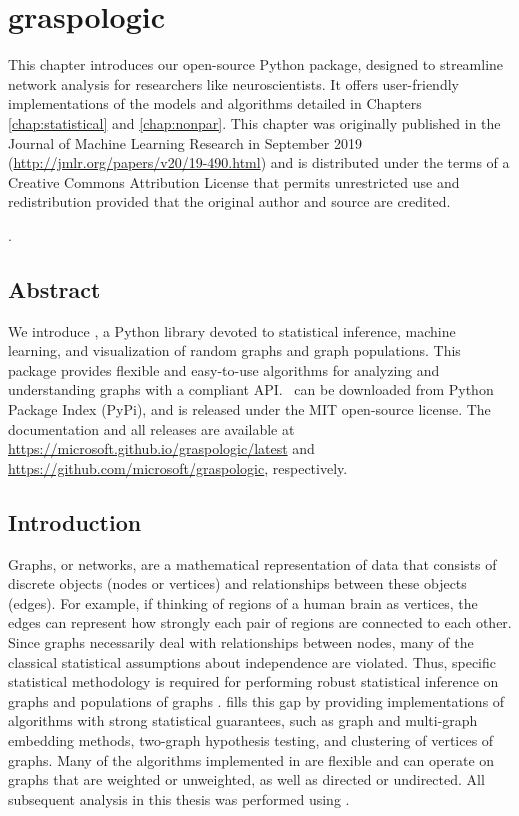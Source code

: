 \chapter{graspologic} \label{chap:graspologic}

This chapter introduces our open-source Python package, designed to streamline network analysis for researchers like neuroscientists. It offers user-friendly implementations of the models and algorithms detailed in Chapters \ref{chap:statistical} and \ref{chap:nonpar}. This chapter was originally published in the Journal of Machine Learning Research in September 2019 (\url{http://jmlr.org/papers/v20/19-490.html}) and is distributed under the terms of a Creative Commons Attribution License that permits unrestricted use and redistribution provided that the original author and source are credited.

\begin{singlespace}         %
    .
\end{singlespace} 

\pagebreak

\section*{Abstract}
We introduce \graspy, a Python library devoted to statistical inference, machine learning, and visualization of random graphs and graph populations. This package  provides flexible and easy-to-use algorithms for analyzing and understanding graphs with a \sklearn compliant API. \graspy ~can be downloaded from Python Package Index (PyPi), and is released under the MIT open-source license. The documentation and all releases are available at \url{https://microsoft.github.io/graspologic/latest} and \url{https://github.com/microsoft/graspologic}, respectively.
\pagebreak


\section{Introduction}
Graphs, or networks, are a mathematical representation of data that consists of discrete objects (nodes or vertices) and relationships between these objects (edges). For example, if thinking of regions of a human brain as vertices, the edges can represent how strongly each pair of regions are connected to each other. 
Since graphs necessarily deal with relationships between nodes, many of the classical statistical assumptions about independence are violated. Thus, specific statistical methodology is required for performing robust statistical inference on graphs and populations of graphs \cite{survey-rdpg}. \graspy fills this gap by providing implementations of algorithms with strong statistical guarantees, such as graph and multi-graph embedding methods, two-graph hypothesis testing, and clustering of vertices of graphs. Many of the algorithms implemented in \graspy are flexible and can operate on graphs that are weighted or unweighted, as well as directed or undirected. All subsequent analysis in this thesis was performed using \graspy.

